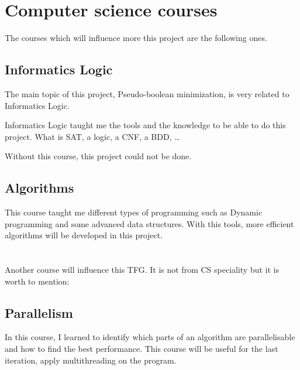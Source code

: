 
\chapter{Computer science courses} %

\label{Chapter3} %

The courses which will influence more this project are the following ones.\\

\section{Informatics Logic}

The main topic of this project, Pseudo-boolean minimization, is very related to Informatics Logic.

Informatics Logic taught me the tools and the knowledge to be able to do this project. What is SAT, a logic, a CNF, a BDD, \ldots

Without this course, this project could not be done.

\section{Algorithms}

This course taught me different types of programming such as Dynamic programming and some advanced data structures. With this tools, more efficient algorithms will be developed in this project. \\\\\\
Another course will influence this TFG. It is not from CS speciality but it is worth to mention:
\section{Parallelism}
In this course, I learned to identify which parts of an algorithm are parallelisable and how to find the best performance. This course will be useful for the last iteration, apply multithreading on the program.

